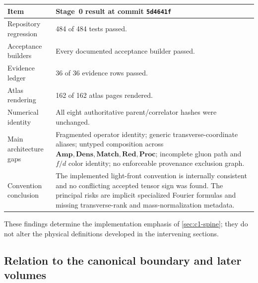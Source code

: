 \documentclass[11pt]{article}
\newcommand{\Amp}{\mathbf{Amp}}
\newcommand{\Dens}{\mathbf{Dens}}
\newcommand{\Match}{\mathbf{Match}}
\newcommand{\Red}{\mathbf{Red}}
\newcommand{\Proc}{\mathbf{Proc}}
\begin{document}
\begin{longtable}{L{0.29\textwidth}L{0.61\textwidth}}
\toprule
Item & Stage~0 result at commit \texttt{5d4641f}\\
\midrule
\endhead
Repository regression & 484 of 484 tests passed.\\
Acceptance builders & Every documented acceptance builder passed.\\
Evidence ledger & 36 of 36 evidence rows passed.\\
Atlas rendering & 162 of 162 atlas pages rendered.\\
Numerical identity & All eight authoritative parent/correlator hashes were unchanged.\\
Main architecture gaps & Fragmented operator identity; generic transverse-coordinate aliases; untyped composition across \(\Amp,\Dens,\Match,\Red,\Proc\); incomplete gluon path and \(f/d\) color identity; no enforceable provenance exclusion graph.\\
Convention conclusion & The implemented light-front convention is internally consistent and no conflicting accepted tensor sign was found.  The principal risks are implicit specialized Fourier formulas and missing transverse-rank and mass-normalization metadata.\\
\bottomrule
\end{longtable}

These findings determine the implementation emphasis of \cref{sec:c1-spine};
they do not alter the physical definitions developed in the intervening
sections.

\subsection{Relation to the canonical boundary and later volumes}
\end{document}

